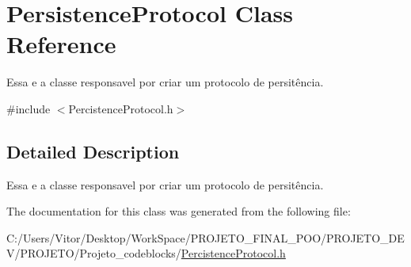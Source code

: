 \hypertarget{class_persistence_protocol}{\section{Persistence\-Protocol Class Reference}
\label{class_persistence_protocol}
}


Essa e a classe responsavel por criar um protocolo de persitência.  




{\ttfamily \#include $<$Percistence\-Protocol.\-h$>$}



\subsection{Detailed Description}
Essa e a classe responsavel por criar um protocolo de persitência. 

The documentation for this class was generated from the following file\-:\begin{DoxyCompactItemize}
\item 
C\-:/\-Users/\-Vitor/\-Desktop/\-Work\-Space/\-P\-R\-O\-J\-E\-T\-O\-\_\-\-F\-I\-N\-A\-L\-\_\-\-P\-O\-O/\-P\-R\-O\-J\-E\-T\-O\-\_\-\-D\-E\-V/\-P\-R\-O\-J\-E\-T\-O/\-Projeto\-\_\-codeblocks/\hyperlink{_percistence_protocol_8h}{Percistence\-Protocol.\-h}\end{DoxyCompactItemize}
